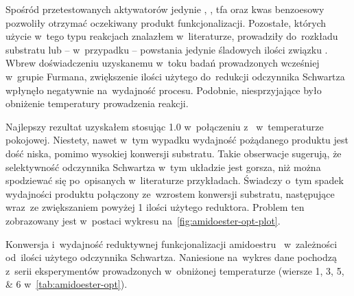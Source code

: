 Spośród przetestowanych aktywatorów jedynie , , \gls{tfa}
  oraz kwas benzoesowy pozwoliły otrzymać oczekiwany produkt funkcjonalizacji.
Pozostałe, których użycie w~tego typu reakcjach znalazłem w~literaturze,
  prowadziły do~rozkładu substratu lub \--- w~przypadku  \--- powstania jedynie
  śladowych ilości związku .
Wbrew doświadczeniu uzyskanemu w~toku badań prowadzonych wcześniej w~grupie Furmana,
  zwiększenie ilości użytego do~redukcji odczynnika Schwartza wpłynęło negatywnie
  na~wydajność procesu.
Podobnie, niesprzyjające było obniżenie temperatury prowadzenia reakcji.

Najlepszy rezultat uzyskałem stosując \SI{1.0}{\equiv} \schwartz{} w~połączeniu
  z~ w~temperaturze pokojowej.
Niestety, nawet w~tym wypadku wydajność pożądanego produktu jest dość niska,
  pomimo wysokiej konwersji substratu.
Takie obserwacje sugerują, że selektywność odczynnika Schwartza w~tym układzie
  jest gorsza, niż można spodziewać się po~opisanych w~literaturze przykładach.
Świadczy o~tym spadek wydajności produktu połączony ze~wzrostem konwersji substratu,
  następujące wraz~ze zwiększaniem powyżej \SI{1}{\equiv} ilości użytego reduktora.
Problem ten zobrazowany jest w~postaci wykresu na~\cref{fig:amidoester-opt-plot}.

\begin{marginfigure}
  \caption{
    Konwersja i~wydajność reduktywnej funkcjonalizacji amidoestru~
      w~zależności od~ilości użytego odczynnika Schwartza.
    Naniesione na~wykres dane pochodzą z~serii eksperymentów prowadzonych w~obniżonej temperaturze
      (wiersze \numlist{1; 3; 5; 6} w~\cref{tab:amidoester-opt}).
  }
  \label{fig:amidoester-opt-plot}
\end{marginfigure}

